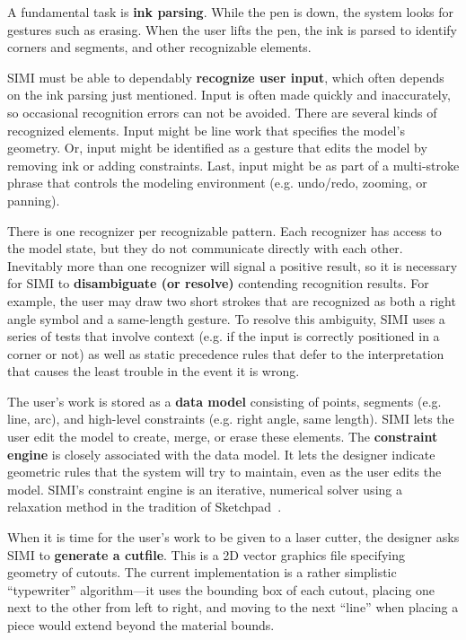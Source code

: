 A fundamental task is \textbf{ink parsing}. While the pen is down, the
system looks for gestures such as erasing. When the user lifts the
pen, the ink is parsed to identify corners and segments, and other
recognizable elements.

SIMI must be able to dependably \textbf{recognize user input}, which
often depends on the ink parsing just mentioned. Input is often made
quickly and inaccurately, so occasional recognition errors can not be
avoided. There are several kinds of recognized elements. Input might
be line work that specifies the model's geometry. Or, input might be
identified as a gesture that edits the model by removing ink or adding
constraints. Last, input might be as part of a multi-stroke phrase
that controls the modeling environment (e.g. undo/redo, zooming, or
panning).

There is one recognizer per recognizable pattern. Each recognizer has
access to the model state, but they do not communicate directly with
each other. Inevitably more than one recognizer will signal a positive
result, so it is necessary for SIMI to \textbf{disambiguate (or
  resolve)} contending recognition results. For example, the user may
draw two short strokes that are recognized as both a right angle
symbol and a same-length gesture. To resolve this ambiguity, SIMI uses
a series of tests that involve context (e.g. if the input is correctly
positioned in a corner or not) as well as static precedence rules that
defer to the interpretation that causes the least trouble in the event
it is wrong.

The user's work is stored as a \textbf{data model} consisting of
points, segments (e.g. line, arc), and high-level constraints
(e.g. right angle, same length). SIMI lets the user edit the model to
create, merge, or erase these elements. The \textbf{constraint engine}
is closely associated with the data model. It lets the designer
indicate geometric rules that the system will try to maintain, even as
the user edits the model. SIMI's constraint engine is an iterative,
numerical solver using a relaxation method in the tradition of
Sketchpad~\cite{sutherland-sketchpad}.

When it is time for the user's work to be given to a laser cutter, the
designer asks SIMI to \textbf{generate a cutfile}. This is a 2D vector
graphics file specifying geometry of cutouts. The current
implementation is a rather simplistic ``typewriter'' algorithm---it
uses the bounding box of each cutout, placing one next to the other
from left to right, and moving to the next ``line'' when placing a
piece would extend beyond the material bounds.

